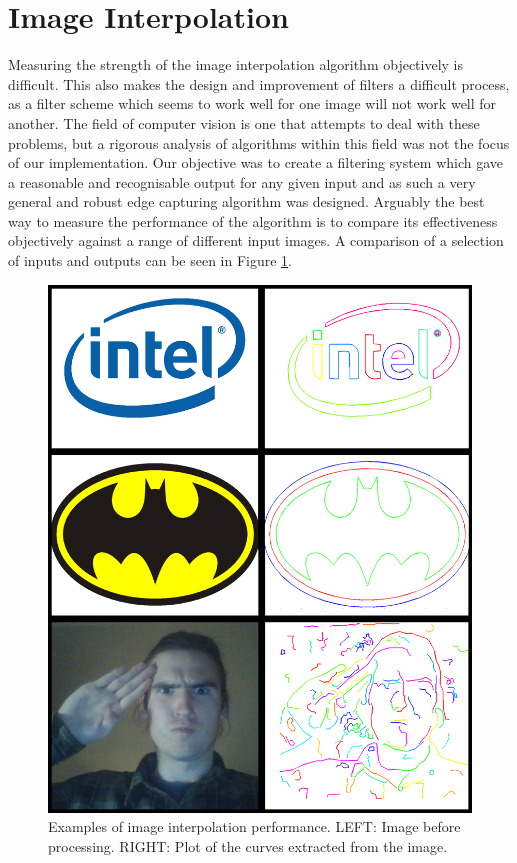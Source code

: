 \section{Image Interpolation}
Measuring the strength of the image interpolation algorithm objectively is difficult. This also makes the design and improvement of filters a difficult process, as a filter scheme which seems to work well for one image will not work well for another. The field of computer vision is one that attempts to deal with these problems, but a rigorous analysis of algorithms within this field was not the focus of our implementation. Our objective was to create a filtering system which gave a reasonable and recognisable output for any given input and as such a very general and robust edge capturing algorithm was designed. Arguably the best way to measure the performance of the algorithm is to compare its effectiveness objectively against a range of different input images. A comparison of a selection of inputs and outputs can be seen in Figure \ref{fig:imageInterpolation}.

\begin{figure}[htbp]  
\includegraphics[width=\textwidth]{figures/performance/imageInterpolation.png}
\caption[Examples of image interpolation performance]{Examples of image interpolation performance. LEFT: Image before processing. RIGHT: Plot of the curves extracted from the image.
\label{fig:imageInterpolation}}
\end{figure}

